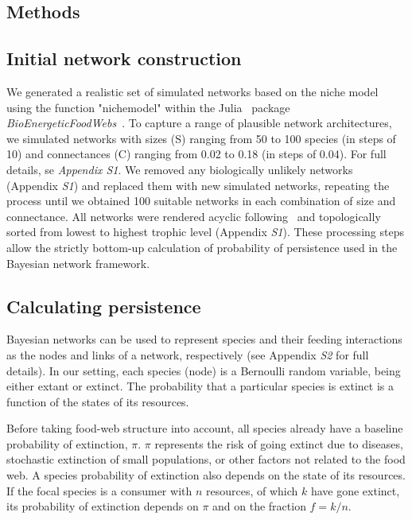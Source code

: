\documentclass[12pt]{article}
\begin{document}
\begin{spacing}{2.0}
\section*{Methods}

	\subsection*{Initial network construction}

		We generated a realistic set of simulated networks based on the niche model~\citep{Williams2000,Stouffer2007} using the function "nichemodel" within the Julia~\citep{Bezanson2017julia} package \emph{BioEnergeticFoodWebs}~\citep{bioenergfw}. 
		To capture a range of plausible network architectures, we simulated networks with sizes (S) ranging from 50 to 100 species (in steps of 10) and connectances (C) ranging from 0.02 to 0.18 (in steps of 0.04). 
		For full details, se \emph{Appendix S1}.
		We removed any biologically unlikely networks (Appendix \emph{S1}) and replaced them with new simulated networks, repeating the process until we obtained 100 suitable networks in each combination of size and connectance.
		All networks were rendered acyclic following~\citet{Allesina2009functional} and topologically sorted from lowest to highest trophic level (Appendix \emph{S1}).
		These processing steps allow the strictly bottom-up calculation of probability of persistence used in the Bayesian network framework.
		
		
	\subsection*{Calculating persistence}	
        Bayesian networks can be used to represent species and their feeding interactions as the nodes and links of a network, respectively (see Appendix \emph{S2} for full details).
        In our setting, each species (node) is a Bernoulli random variable, being either extant or extinct. 
        The probability that a particular species is extinct is a function of the states of its resources.
        
		Before taking food-web structure into account, all species already have a baseline probability of extinction, $\pi$. 
		$\pi$ represents the risk of going extinct due to diseases, stochastic extinction of small populations, or other factors not related to the food web.
		A species probability of extinction also depends on the state of its resources. 
        If the focal species is a consumer with $n$ resources, of which $k$ have gone extinct, its probability of extinction depends on $\pi$ and on the fraction $f = k/n$.
        

\end{spacing}
\end{document}
